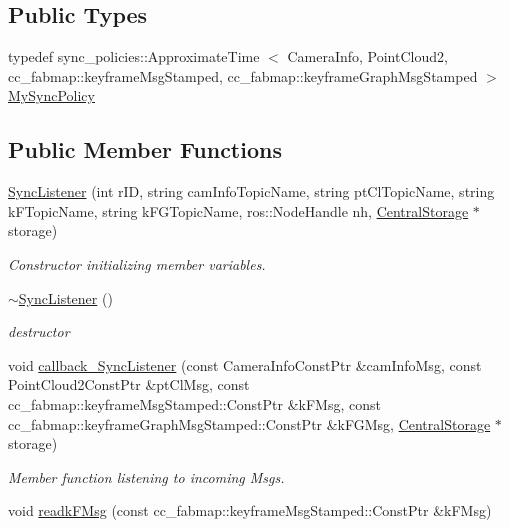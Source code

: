 \subsection*{\-Public \-Types}
\begin{DoxyCompactItemize}
\item 
typedef \*
sync\-\_\-policies\-::\-Approximate\-Time\*
$<$ \-Camera\-Info, \-Point\-Cloud2, \*
cc\-\_\-fabmap\-::keyframe\-Msg\-Stamped, \*
cc\-\_\-fabmap\-::keyframe\-Graph\-Msg\-Stamped $>$ \hyperlink{classSyncListener_aff51e417f521f074342bc0344856d01e}{\-My\-Sync\-Policy}
\end{DoxyCompactItemize}
\subsection*{\-Public \-Member \-Functions}
\begin{DoxyCompactItemize}
\item 
\hyperlink{classSyncListener_ae69658445cf77c60360e14748cce3129}{\-Sync\-Listener} (int r\-I\-D, string cam\-Info\-Topic\-Name, string pt\-Cl\-Topic\-Name, string k\-F\-Topic\-Name, string k\-F\-G\-Topic\-Name, ros\-::\-Node\-Handle nh, \hyperlink{classCentralStorage}{\-Central\-Storage} $\ast$storage)
\begin{DoxyCompactList}\small\item\em \-Constructor initializing member variables. \end{DoxyCompactList}\item 
\hyperlink{classSyncListener_a3e0b75c3cca66f812fc3eac4f9c4d36c}{$\sim$\-Sync\-Listener} ()
\begin{DoxyCompactList}\small\item\em destructor \end{DoxyCompactList}\item 
void \hyperlink{classSyncListener_a7eb4b7e88109cb8a2e352bd7454d6af6}{callback\-\_\-\-Sync\-Listener} (const \-Camera\-Info\-Const\-Ptr \&cam\-Info\-Msg, const \-Point\-Cloud2\-Const\-Ptr \&pt\-Cl\-Msg, const cc\-\_\-fabmap\-::keyframe\-Msg\-Stamped\-::\-Const\-Ptr \&k\-F\-Msg, const cc\-\_\-fabmap\-::keyframe\-Graph\-Msg\-Stamped\-::\-Const\-Ptr \&k\-F\-G\-Msg, \hyperlink{classCentralStorage}{\-Central\-Storage} $\ast$storage)
\begin{DoxyCompactList}\small\item\em \-Member function listening to incoming \-Msgs. \end{DoxyCompactList}\item 
void \hyperlink{classSyncListener_a2343c140657ed44918b69d4ccfc0f2fc}{readk\-F\-Msg} (const cc\-\_\-fabmap\-::keyframe\-Msg\-Stamped\-::\-Const\-Ptr \&k\-F\-Msg)

\end{DoxyCompactItemize}
